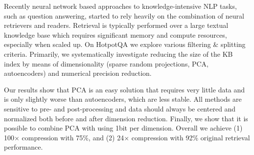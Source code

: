 Recently neural network based approaches to knowledge-intensive NLP tasks, such as question answering, started to rely heavily on the combination of neural retrievers and readers.
Retrieval is typically performed over a large textual knowledge base which requires significant memory and compute resources, especially when scaled up.
On HotpotQA we explore various filtering \& splitting criteria.
Primarily, we systematically investigate reducing the size of the KB index by means of dimensionality (sparse random projections, PCA, autoencoders) and numerical precision reduction.

Our results show that PCA is an easy solution that requires very little data and is only slightly worse than autoencoders, which are less stable.
All methods are sensitive to pre- and post-processing and data should always be centered and normalized both before and after dimension reduction.
Finally, we show that it is possible to combine PCA with using 1bit per dimension.
Overall we achieve (1) 100$\times$ compression with 75\%, and (2) 24$\times$ compression with 92\% original retrieval performance.

